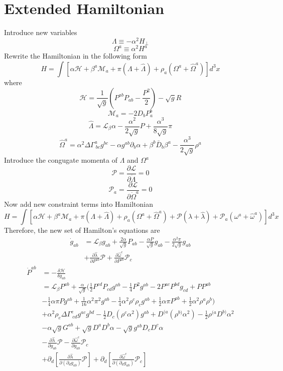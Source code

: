 \documentclass{article}
\begin{document}
\section{Extended Hamiltonian}
Introduce new variables
\[
\Lambda \equiv -\alpha^2 H_{\perp}
\]
\[
\Omega^{a} \equiv \alpha^2 H^{a}
\]
Rewrite the Hamiltonian in the following form
\[
H = \int [\alpha \mathscr{H} + \beta^{a}\mathscr{M}_{a} + \pi (\Lambda + {\hat \Lambda}) + \rho_{a}(\Omega^{a} + {\hat \Omega}^{a}) ]d^3 x
\]
where
\[
\mathscr{H} = \frac{1}{\sqrt{g}}(P^{ab}P_{ab} - \frac{P^2}{2}) - \sqrt{g}R
\]
\[
\mathscr{M}_{a} = -2D_{b}P^{b}_{a}
\]
\[
{\hat \Lambda} = \mathcal{L}_{\beta}\alpha - \frac{\alpha^2}{2\sqrt{g}}P + \frac{\alpha^3}{8\sqrt{g}}\pi
\]
\[
{\hat \Omega}^{a} = \alpha^2 \Delta \Gamma^{a}_{~bc}g^{bc} - \alpha g^{ab}\partial_{b} \alpha + \beta^{b}{\bar D}_{b} \beta^{a} - \frac{\alpha^3}{2\sqrt{g}}\rho^{a}
\]
Introduce the congugate momenta of $\Lambda$ and $\Omega^a$
\[
\mathscr{P} = \frac{\partial \mathscr{L}}{\partial {\dot \Lambda}} = 0
\]
\[
\mathscr{P}_{a} = \frac{\partial \mathscr{L}}{\partial {\dot \Omega^{a}}} = 0
\]
Now add new constraint terms into Hamiltonian
\[
H = \int [\alpha \mathscr{H} + \beta^{a} \mathscr{M}_{a} + \pi (\Lambda + {\hat \Lambda}) + \rho_{a}(\Omega^{a} + {\hat \Omega}^{a}) + \mathscr{P}(\lambda + {\hat \lambda}) +  \mathscr{P}_{a}(\omega^{a} + {\hat \omega}^{a})]d^3 x
\]
Therefore, the new set of Hamilton's equations are
\begin{align*}
{\dot g_{ab}} & = \mathcal{L}_{\beta}g_{ab} + \frac{2\alpha}{\sqrt{g}}P_{ab} - \frac{\alpha P}{\sqrt{g}}g_{ab} - \frac{\alpha^2 \pi }{2\sqrt{g}}g_{ab} \\
& + \frac{\partial {\hat \lambda}}{\partial P^{ab}}\mathscr{P} + \frac{\partial {\hat \omega}^{c}}{\partial P^{ab}}\mathscr{P}_{c}
\end{align*}
\begin{align*}
{\dot P^{ab}} & = -\frac{\delta \mathcal{H}}{\delta g_{ab}} \\ &
= \mathcal{L}_{\beta}P^{ab} + \frac{\alpha}{\sqrt{g}}(\frac{1}{2}P^{cd}P_{cd}g^{ab} - \frac{1}{4}P^{2}g^{ab} - 2P^{ac}P^{bd}g_{cd} + PP^{ab} \\
&-\frac{1}{4}\alpha \pi P g^{ab} + \frac{1}{16}\alpha^2 \pi^2 g^{ab} - \frac{1}{4}\alpha^2 \rho^{c}\rho_{c}g^{ab} + \frac{1}{2}\alpha \pi P^{ab} + \frac{1}{2}\alpha^2\rho^{a}\rho^{b}) \\
&+ \alpha^2 \rho_{e}\Delta \Gamma^{e}_{~cd}g^{ac}g^{bd} - \frac{1}{2}D_{c}(\rho^{c} \alpha^2)g^{ab} + D^{(a}(\rho^{b)} \alpha^2) - \frac{1}{2}\rho^{(a}D^{b)}\alpha^2\\
& - \alpha \sqrt{g}G^{ab} + \sqrt{g} D^{a}D^{b}\alpha - \sqrt{g}g^{ab}D_{c}D^{c} \alpha\\
& - \frac{\partial {\hat \lambda}}{\partial g_{ab}}\mathscr{P} - \frac{\partial {\hat \omega}^{c}}{\partial g_{ab}}\mathscr{P}_{c}\\
& + \partial_{d}[\frac{\partial {\hat \lambda}}{\partial(\partial_{d}g_{ab})}\mathscr{P}] + \partial_{d}[\frac{\partial {\hat \omega^{c}}}{\partial(\partial_{d}g_{ab})}\mathscr{P}_{c}]
\end{align*}
\end{document}
